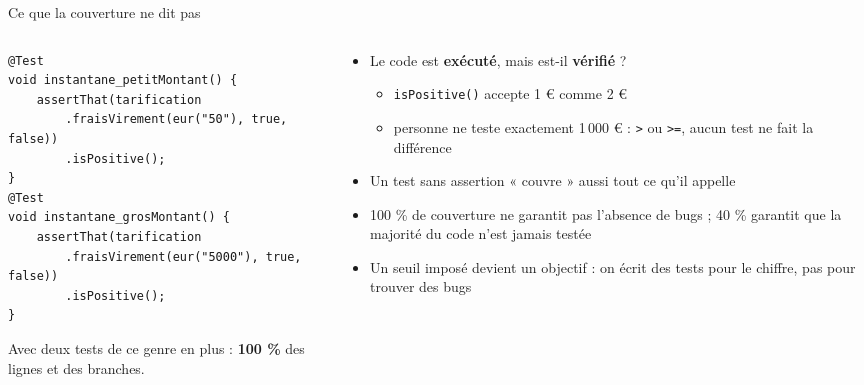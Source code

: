 \documentclass[aspectratio=169,10pt]{beamer}
\begin{document}
\begin{frame}[fragile]{Ce que la couverture ne dit pas}
  \begin{columns}[T]
    \begin{column}{0.5\textwidth}
\begin{lstlisting}[basicstyle=\lstcode\scriptsize]
@Test
void instantane_petitMontant() {
    assertThat(tarification
        .fraisVirement(eur("50"), true, false))
        .isPositive();
}
@Test
void instantane_grosMontant() {
    assertThat(tarification
        .fraisVirement(eur("5000"), true, false))
        .isPositive();
}
\end{lstlisting}
      \small Avec deux tests de ce genre en plus : \textbf{100 \%} des lignes et des branches.
    \end{column}
    \begin{column}{0.46\textwidth}
      \small
      \begin{itemize}
        \item Le code est \textbf{exécuté}, mais est-il \textbf{vérifié} ?
          \begin{itemize}
            \item \texttt{isPositive()} accepte 1 \euro{} comme 2 \euro{}
            \item personne ne teste exactement 1\,000 \euro{} : \texttt{>} ou \texttt{>=}, aucun test ne fait la différence
          \end{itemize}
        \item Un test sans assertion « couvre » aussi tout ce qu'il appelle
        \item 100 \% de couverture ne garantit pas l'absence de bugs ; 40 \% garantit que la majorité du code n'est jamais testée
        \item Un seuil imposé devient un objectif : on écrit des tests pour le chiffre, pas pour trouver des bugs
      \end{itemize}
    \end{column}
  \end{columns}
\end{frame}
\end{document}
